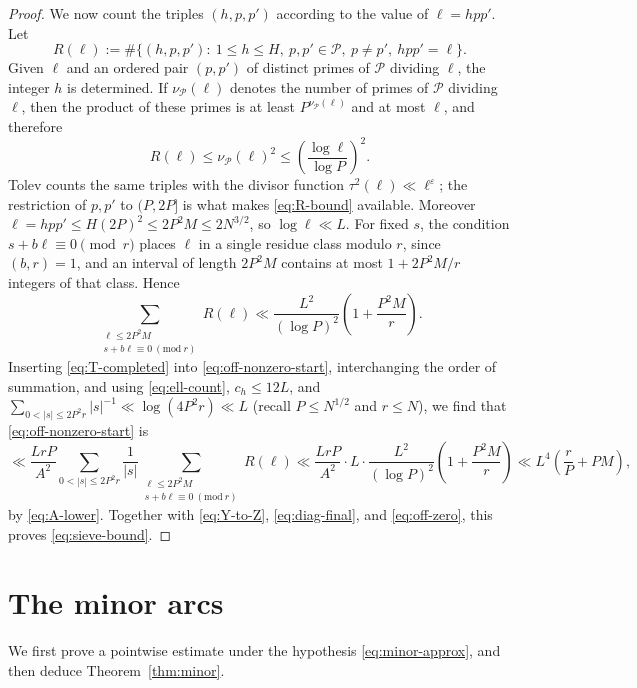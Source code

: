 \documentclass[11pt]{amsart}
\numberwithin{equation}{section}
\numberwithin{figure}{section}
\theoremstyle{definition}
\newcommand{\eps}{\varepsilon}
\begin{document}
\begin{proof}
We now count the triples $(h,p,p')$ according to the value of
$\ell=hpp'$.  Let
\[
  R(\ell):=\#\{(h,p,p'):\ 1\le h\le H,\ p,p'\in\mathcal P,\ p\ne p',\ hpp'=\ell\}.
\]
Given $\ell$ and an ordered pair $(p,p')$ of distinct primes of
$\mathcal P$ dividing $\ell$, the integer $h$ is determined.  If
$\nu_{\mathcal P}(\ell)$ denotes the number of primes of $\mathcal P$
dividing $\ell$, then the product of these primes is at least
$P^{\nu_{\mathcal P}(\ell)}$ and at most $\ell$, and therefore
\begin{equation}\label{eq:R-bound}
  R(\ell)\le\nu_{\mathcal P}(\ell)^2\le\left(\frac{\log\ell}{\log P}\right)^2.
\end{equation}
Tolev counts the same triples with the divisor function
$\tau^2(\ell)\ll\ell^{\eps}$; the restriction of $p,p'$ to $(P,2P]$ is
what makes \eqref{eq:R-bound} available.  Moreover
$\ell=hpp'\le H(2P)^2\le2P^2M\le2N^{3/2}$, so $\log\ell\ll L$.  For
fixed $s$, the condition $s+b\ell\equiv0\pmod r$ places $\ell$ in a single
residue class modulo $r$, since $(b,r)=1$, and an interval of length
$2P^2M$ contains at most $1+2P^2M/r$ integers of that class.  Hence
\begin{equation}\label{eq:ell-count}
  \sum_{\substack{\ell\le2P^2M\\ s+b\ell\equiv0\ (\mathrm{mod}\ r)}}R(\ell)
  \ll\frac{L^2}{(\log P)^2}\left(1+\frac{P^2M}r\right).
\end{equation}
Inserting \eqref{eq:T-completed} into \eqref{eq:off-nonzero-start},
interchanging the order of summation, and using \eqref{eq:ell-count},
$c_h\le12L$, and $\sum_{0<|s|\le2P^2r}|s|^{-1}\ll\log(4P^2r)\ll L$
(recall $P\le N^{1/2}$ and $r\le N$), we find that
\eqref{eq:off-nonzero-start} is
\[
  \ll\frac{LrP}{A^2}\sum_{0<|s|\le2P^2r}\frac1{|s|}
  \sum_{\substack{\ell\le2P^2M\\ s+b\ell\equiv0\ (\mathrm{mod}\ r)}}R(\ell)
  \ll\frac{LrP}{A^2}\cdot L\cdot\frac{L^2}{(\log P)^2}\left(1+\frac{P^2M}r\right)
  \ll L^4\left(\frac rP+PM\right),
\]
by \eqref{eq:A-lower}.  Together with \eqref{eq:Y-to-Z},
\eqref{eq:diag-final}, and \eqref{eq:off-zero}, this proves
\eqref{eq:sieve-bound}.
\end{proof}


\section{The minor arcs}\label{sec:minor}

We first prove a pointwise estimate under the hypothesis
\eqref{eq:minor-approx}, and then deduce Theorem~\ref{thm:minor}.
\end{document}
